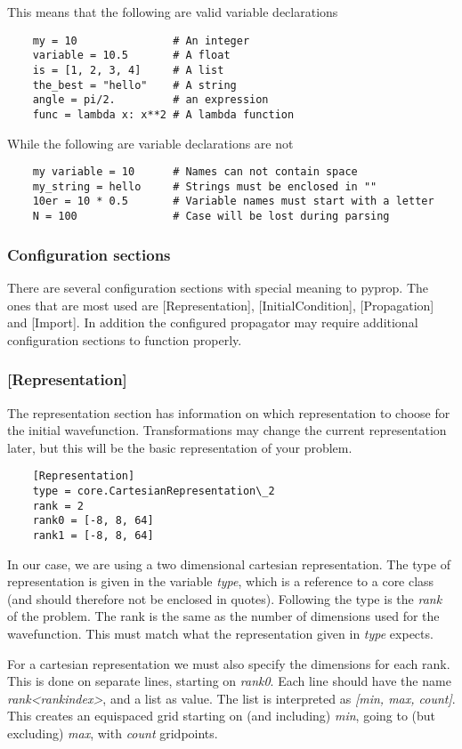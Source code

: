 \noindent This means that the following are valid variable declarations
\begin{verbatim}
	my = 10               # An integer
	variable = 10.5       # A float
	is = [1, 2, 3, 4]     # A list
	the_best = "hello"    # A string
	angle = pi/2.         # an expression
	func = lambda x: x**2 # A lambda function
\end{verbatim}
While the following are variable declarations are not
\begin{verbatim}
	my variable = 10      # Names can not contain space
	my_string = hello     # Strings must be enclosed in ""
	10er = 10 * 0.5       # Variable names must start with a letter
	N = 100               # Case will be lost during parsing
\end{verbatim}

\subsubsection*{Configuration sections}
There are several configuration sections with special meaning to pyprop. The ones that are most used are [Representation], 
[InitialCondition], [Propagation] and [Import]. In addition the configured propagator may require additional 
configuration sections to function properly.

\subsubsection*{[Representation]}
The representation section has information on which representation to choose for the initial wavefunction. Transformations
may change the current representation later, but this will be the basic representation of your problem. 
\begin{verbatim}
	[Representation]
	type = core.CartesianRepresentation\_2
	rank = 2
	rank0 = [-8, 8, 64]
	rank1 = [-8, 8, 64]
\end{verbatim}
In our case, we are
using a two dimensional cartesian representation. The type of representation is given in the variable \textit{type}, which
is a reference to a core class (and should therefore not be enclosed in quotes). Following the type is the \textit{rank} 
of the problem. The rank is the same as the number of dimensions used for the wavefunction. 
This must match what the representation given in \textit{type} expects.

For a cartesian representation we must also specify the dimensions for each rank. This is done on separate lines, 
starting on \textit{rank0}. Each line should have the name \textit{rank<rankindex>}, and a list as value. The list is
interpreted as \textit{[min, max, count]}. This creates an equispaced grid starting on (and including) \textit{min},
going to (but excluding) \textit{max}, with \textit{count} gridpoints.

